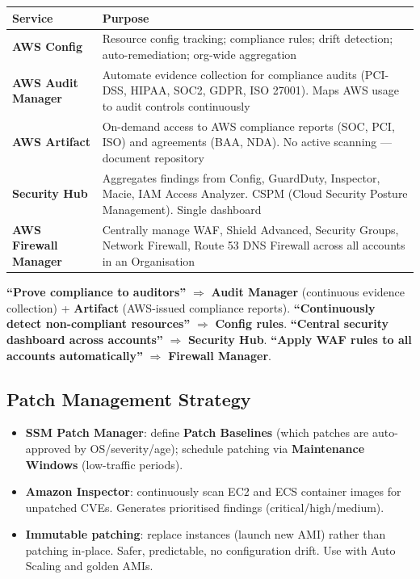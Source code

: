 \begin{comparebox}[title={Compliance and governance tools}]
\begin{tabular}{@{}p{3.5cm}p{7.5cm}@{}}
\toprule
\textbf{Service} & \textbf{Purpose} \\
\midrule
\textbf{AWS Config}         & Resource config tracking; compliance rules; drift detection;
                              auto-remediation; org-wide aggregation \\[4pt]
\textbf{AWS Audit Manager}  & Automate evidence collection for compliance audits (PCI-DSS, HIPAA, SOC2,
                              GDPR, ISO 27001). Maps AWS usage to audit controls continuously \\[4pt]
\textbf{AWS Artifact}       & On-demand access to AWS compliance reports (SOC, PCI, ISO) and
                              agreements (BAA, NDA). No active scanning --- document repository \\[4pt]
\textbf{Security Hub}       & Aggregates findings from Config, GuardDuty, Inspector, Macie, IAM Access
                              Analyzer. CSPM (Cloud Security Posture Management). Single dashboard \\[4pt]
\textbf{AWS Firewall Manager} & Centrally manage WAF, Shield Advanced, Security Groups, Network Firewall,
                              Route 53 DNS Firewall across all accounts in an Organisation \\
\bottomrule
\end{tabular}
\end{comparebox}

\begin{examtip}
\textbf{``Prove compliance to auditors''} $\Rightarrow$ \textbf{Audit Manager} (continuous evidence collection)
+ \textbf{Artifact} (AWS-issued compliance reports).
\textbf{``Continuously detect non-compliant resources''} $\Rightarrow$ \textbf{Config rules}.
\textbf{``Central security dashboard across accounts''} $\Rightarrow$ \textbf{Security Hub}.
\textbf{``Apply WAF rules to all accounts automatically''} $\Rightarrow$ \textbf{Firewall Manager}.
\end{examtip}

\subsection{Patch Management Strategy}

\begin{itemize}
  \item \textbf{SSM Patch Manager}: define \textbf{Patch Baselines} (which patches are auto-approved
        by OS/severity/age); schedule patching via \textbf{Maintenance Windows}
        (low-traffic periods).
  \item \textbf{Amazon Inspector}: continuously scan EC2 and ECS container images for unpatched
        CVEs. Generates prioritised findings (critical/high/medium).
  \item \textbf{Immutable patching}: replace instances (launch new AMI) rather than patching
        in-place. Safer, predictable, no configuration drift. Use with Auto Scaling and golden AMIs.
\end{itemize}

